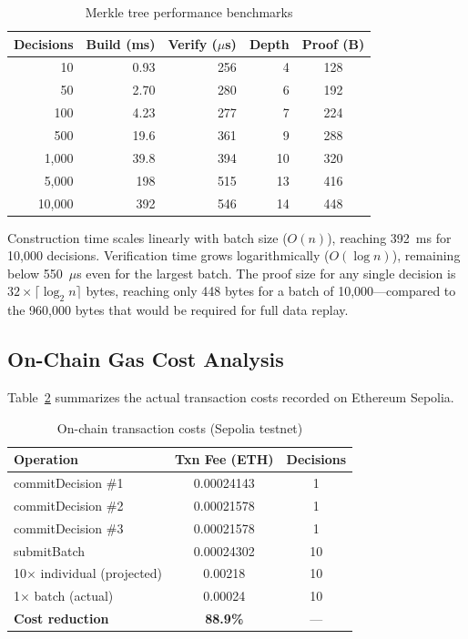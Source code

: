 \documentclass[manuscript,nonacm]{acmart}
\begin{document}
\begin{table}[h]
\centering
\caption{Merkle tree performance benchmarks}
\label{tab:performance}
\begin{tabular}{@{}rrrrc@{}}
\toprule
\textbf{Decisions} & \textbf{Build (ms)} & \textbf{Verify ($\mu$s)} & \textbf{Depth} & \textbf{Proof (B)} \\
\midrule
10     & 0.93   & 256   & 4  & 128  \\
50     & 2.70   & 280   & 6  & 192  \\
100    & 4.23   & 277   & 7  & 224  \\
500    & 19.6   & 361   & 9  & 288  \\
1,000  & 39.8   & 394   & 10 & 320  \\
5,000  & 198    & 515   & 13 & 416  \\
10,000 & 392    & 546   & 14 & 448  \\
\bottomrule
\end{tabular}
\end{table}

Construction time scales linearly with batch size ($O(n)$), reaching 392~ms for 10,000 decisions. Verification time grows logarithmically ($O(\log n)$), remaining below 550~$\mu$s even for the largest batch. The proof size for any single decision is $32 \times \lceil \log_2 n \rceil$ bytes, reaching only 448 bytes for a batch of 10,000---compared to the 960,000 bytes that would be required for full data replay.

\subsection{On-Chain Gas Cost Analysis}

Table~\ref{tab:gas} summarizes the actual transaction costs recorded on Ethereum Sepolia.

\begin{table}[h]
\centering
\caption{On-chain transaction costs (Sepolia testnet)}
\label{tab:gas}
\begin{tabular}{@{}lcc@{}}
\toprule
\textbf{Operation} & \textbf{Txn Fee (ETH)} & \textbf{Decisions} \\
\midrule
commitDecision \#1   & 0.00024143 & 1  \\
commitDecision \#2   & 0.00021578 & 1  \\
commitDecision \#3   & 0.00021578 & 1  \\
submitBatch          & 0.00024302 & 10 \\
\midrule
10$\times$ individual (projected) & 0.00218    & 10 \\
1$\times$ batch (actual)          & 0.00024    & 10 \\
\midrule
\textbf{Cost reduction}           & \textbf{88.9\%} & --- \\
\bottomrule
\end{tabular}
\end{table}
\end{document}
